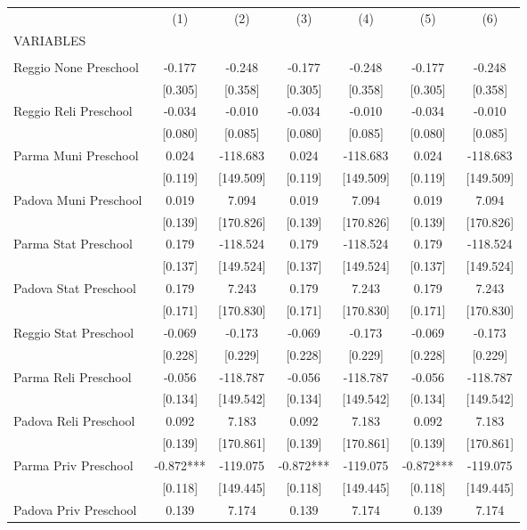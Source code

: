 \begin{tabular}{lcccccc} \hline
 & (1) & (2) & (3) & (4) & (5) & (6) \\
VARIABLES &  &  &  &  &  &  \\ \hline
 &  &  &  &  &  &  \\
Reggio None Preschool & -0.177 & -0.248 & -0.177 & -0.248 & -0.177 & -0.248 \\
 & [0.305] & [0.358] & [0.305] & [0.358] & [0.305] & [0.358] \\
Reggio Reli Preschool & -0.034 & -0.010 & -0.034 & -0.010 & -0.034 & -0.010 \\
 & [0.080] & [0.085] & [0.080] & [0.085] & [0.080] & [0.085] \\
Parma Muni Preschool & 0.024 & -118.683 & 0.024 & -118.683 & 0.024 & -118.683 \\
 & [0.119] & [149.509] & [0.119] & [149.509] & [0.119] & [149.509] \\
Padova Muni Preschool & 0.019 & 7.094 & 0.019 & 7.094 & 0.019 & 7.094 \\
 & [0.139] & [170.826] & [0.139] & [170.826] & [0.139] & [170.826] \\
Parma Stat Preschool & 0.179 & -118.524 & 0.179 & -118.524 & 0.179 & -118.524 \\
 & [0.137] & [149.524] & [0.137] & [149.524] & [0.137] & [149.524] \\
Padova Stat Preschool & 0.179 & 7.243 & 0.179 & 7.243 & 0.179 & 7.243 \\
 & [0.171] & [170.830] & [0.171] & [170.830] & [0.171] & [170.830] \\
Reggio Stat Preschool & -0.069 & -0.173 & -0.069 & -0.173 & -0.069 & -0.173 \\
 & [0.228] & [0.229] & [0.228] & [0.229] & [0.228] & [0.229] \\
Parma Reli Preschool & -0.056 & -118.787 & -0.056 & -118.787 & -0.056 & -118.787 \\
 & [0.134] & [149.542] & [0.134] & [149.542] & [0.134] & [149.542] \\
Padova Reli Preschool & 0.092 & 7.183 & 0.092 & 7.183 & 0.092 & 7.183 \\
 & [0.139] & [170.861] & [0.139] & [170.861] & [0.139] & [170.861] \\
Parma Priv Preschool & -0.872*** & -119.075 & -0.872*** & -119.075 & -0.872*** & -119.075 \\
 & [0.118] & [149.445] & [0.118] & [149.445] & [0.118] & [149.445] \\
Padova Priv Preschool & 0.139 & 7.174 & 0.139 & 7.174 & 0.139 & 7.174 \\

\end{tabular}
